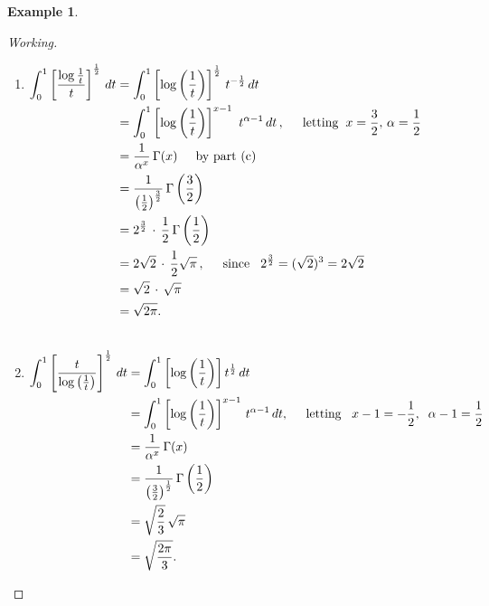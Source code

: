 \documentclass[12pt,a4paper]{report}
\theoremstyle{definition}
\newtheorem{exa}[thm]{Example}
\theoremstyle{plain}
\begin{document}
\begin{exa}
\begin{enumerate}
\begin{proof}[Working]\textbf{}
\begin{enumerate}
\item[(i).] $\begin{aligned}[t]
\int_0^1\left[\frac{\log \frac{1}{t}}{t}\right]^{\frac{1}{2}}\, dt & = \int_0^1\left[\log\left(\frac{1}{t}\right)\right]^{\frac{1}{2}}\, t^{-\frac{1}{2}}\, dt\\
& = \int_0^1\left[\log\left(\frac{1}{t}\right)\right]^{x - 1}\ t^{\alpha - 1}\, dt\, , \hspace{0.5cm} \text{letting}\hspace{0.2cm} x = \frac{3}{2}, \, \alpha = \frac{1}{2}\\
& = \frac{1}{\alpha^x}\, \Gamma(x) \hspace{0.5cm} \text{by part (c)}\\
& = \frac{1}{\left(\frac{1}{2}\right)^{\frac{3}{2}}}\, \Gamma\left(\frac{3}{2}\right)\\
& = 2^{\frac{3}{2}}\, \cdot\, \frac{1}{2}\, \Gamma\left(\frac{1}{2}\right)\\
& = 2\sqrt{2}\, \cdot\, \frac{1}{2}\sqrt{\pi}\, , \hspace{0.5cm} \text{since}\hspace{0.3cm} 2^{\frac{3}{2}} = (\sqrt{2})^3 = 2\sqrt{2}\\
& = \sqrt{2}\, \cdot\, \sqrt{\pi}\\
& = \sqrt{2\pi}.
\end{aligned}$\\\\


\item[(ii).]  $\begin{aligned}[t]
\int_0^1 \left[\frac{t}{\log\left(\frac{1}{t}\right)}\right]^{\frac{1}{2}}\, dt & = \int_0^1\left[\log\left(\frac{1}{t}\right)\right]t^{\frac{1}{2}}\, dt \\
& = \int^1_0\left[\log\left(\frac{1}{t}\right)\right]^{x-1}\, t^{\alpha - 1}\, dt,\hspace{0.5cm} \text{letting}\hspace{0.3cm} x - 1 = -\frac{1}{2}, \hspace{0.2cm} \alpha - 1 = \frac{1}{2}\\
& = \frac{1}{\alpha^x}\, \Gamma(x)\\
& = \frac{1}{\left(\frac{3}{2}\right)^{\frac{1}{2}}}\, \Gamma\left(\frac{1}{2}\right)\\
& = \sqrt{\frac{2}{3}}\, \sqrt{\pi}\\
& = \sqrt{\frac{2\pi}{3}}.
\end{aligned}$
\end{enumerate}
\end{proof}





\end{enumerate}
\end{exa}
\end{document}
